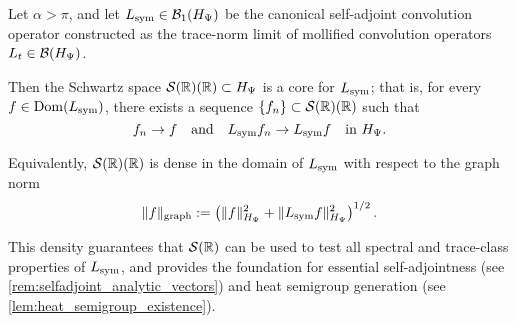 \begin{proposition}
\label{prop:core_schwartz_density}
Let \( \alpha > \pi \), and let \( L_{\mathrm{sym}} \in \mathcal{B}_1(H_{\Psi}) \) be the canonical self-adjoint convolution operator constructed as the trace-norm limit of mollified convolution operators \( L_t \in \mathcal{B}(H_{\Psi}) \).

Then the Schwartz space \( \mathcal{S}(\mathbb{R})(\mathbb{R}) \subset H_{\Psi} \) is a core for \( L_{\mathrm{sym}} \); that is, for every \( f \in \operatorname{Dom}(L_{\mathrm{sym}}) \), there exists a sequence \( \{f_n\} \subset \mathcal{S}(\mathbb{R})(\mathbb{R}) \) such that
\[
f_n \to f \quad \text{and} \quad L_{\mathrm{sym}} f_n \to L_{\mathrm{sym}} f \quad \text{in } H_{\Psi}.
\]

\medskip
\noindent
Equivalently, \( \mathcal{S}(\mathbb{R})(\mathbb{R}) \) is dense in the domain of \( L_{\mathrm{sym}} \) with respect to the graph norm
\[
\|f\|_{\mathrm{graph}} := \left( \|f\|_{H_{\Psi}}^2 + \|L_{\mathrm{sym}} f\|_{H_{\Psi}}^2 \right)^{1/2}.
\]

\medskip
\noindent
This density guarantees that \( \mathcal{S}(\mathbb{R}) \) can be used to test all spectral and trace-class properties of \( L_{\mathrm{sym}} \), and provides the foundation for essential self-adjointness (see \cref{rem:selfadjoint_analytic_vectors}) and heat semigroup generation (see \cref{lem:heat_semigroup_existence}).
\end{proposition}
